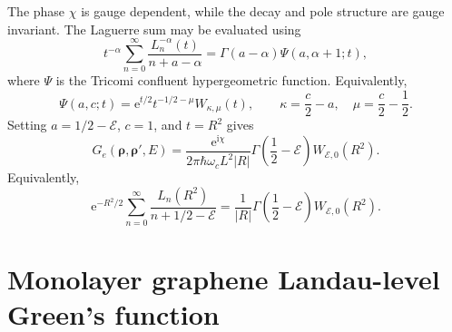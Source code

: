 \documentclass[11pt]{article}
\newcommand{\ii}{\mathrm i}
\newcommand{\ee}{\mathrm e}
\newcommand{\brho}{\bm{\rho}}
\begin{document}
The phase \(\chi\) is gauge dependent, while the decay and pole structure are gauge invariant.
The Laguerre sum may be evaluated using
\begin{equation}
  t^{-\alpha}\sum_{n=0}^{\infty}\frac{L_n^{-\alpha}(t)}{n+a-\alpha}
  =\Gamma(a-\alpha)\Psi(a,\alpha+1;t),
\end{equation}
where \(\Psi\) is the Tricomi confluent hypergeometric function. Equivalently,
\begin{equation}
  \Psi(a,c;t)=\ee^{t/2}t^{-1/2-\mu}W_{\kappa,\mu}(t),
  \qquad \kappa=\frac{c}{2}-a,\quad \mu=\frac{c}{2}-\frac12 .
\end{equation}
Setting \(a=1/2-\mathcal E\), \(c=1\), and \(t=R^2\) gives
\begin{equation}
  \boxed{
  G_e(\brho,\brho',E)=
  \frac{\ee^{\ii\chi}}{2\pi\hbar\omega_cL^2 |R|}
  \Gamma\left(\frac12-\mathcal E\right)
  W_{\mathcal E,0}(R^2) .}
\end{equation}
Equivalently,
\begin{equation}
  \ee^{-R^2/2}\sum_{n=0}^{\infty}\frac{L_n(R^2)}{n+1/2-\mathcal E}
  =\frac{1}{|R|}\Gamma\left(\frac12-\mathcal E\right)W_{\mathcal E,0}(R^2).
\end{equation}

\section{Monolayer graphene Landau-level Green's function}
\end{document}
